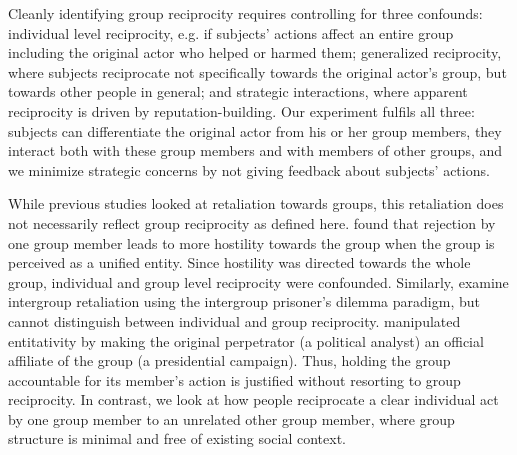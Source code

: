 \documentclass[12pt,a4paper]{article}\usepackage[]{graphicx}\usepackage[]{color}
\begin{document}

Cleanly identifying group reciprocity requires controlling for three confounds: individual level reciprocity, e.g. if
subjects' actions affect an entire group including the original actor who helped or harmed them; generalized reciprocity,
where subjects reciprocate not specifically towards the original actor’s group, but towards other people in general; and
strategic interactions, where apparent reciprocity is driven by reputation-building. 
Our experiment fulfils all three: subjects can differentiate the original actor from his or her group members, they 
interact both with these group members and with members of other groups, and we minimize strategic concerns by not giving
feedback about subjects' actions.


While previous studies looked at retaliation towards groups, this retaliation does not necessarily reflect group reciprocity as defined here. \citet{gaertner2008whenrejection} found that rejection by one group member leads to more hostility towards the group when the group is perceived as a unified entity. Since hostility was directed towards the whole group, individual and group level reciprocity were confounded. Similarly, \citet{bohm2016makes} examine intergroup retaliation using the intergroup prisoner's
dilemma paradigm, but cannot distinguish between individual and group reciprocity.
\citet{stenstrom2008theroles} manipulated entitativity by making the original perpetrator (a political analyst) an official affiliate of the group (a presidential campaign). Thus, holding the group accountable for its member's action is justified without resorting to group reciprocity. In contrast, we look at how people reciprocate a clear individual act by one group member to an unrelated other group member, where group structure is minimal and free of existing social context. 
\end{document}

